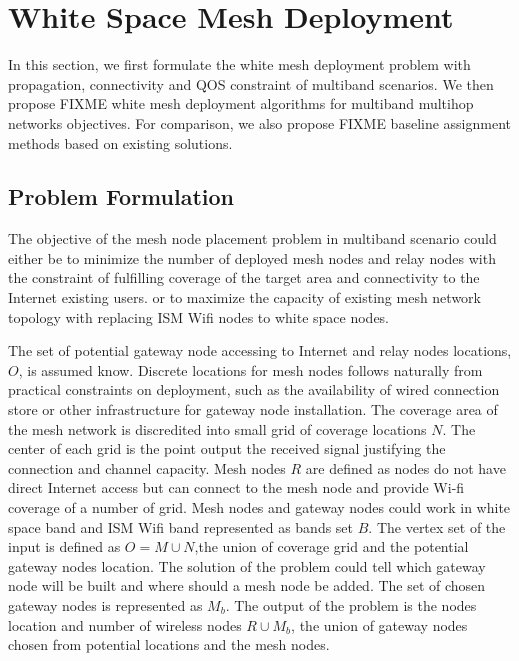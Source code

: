 \section{White Space Mesh Deployment}
\label{sec:model}

In this section, we first formulate the 
white mesh deployment problem
with propagation, connectivity and QOS constraint of multiband scenarios.
We then propose {FIXME} white mesh deployment algorithms for multiband multihop networks objectives.
For comparison, we also propose {FIXME} baseline assignment methods based on existing solutions.

\subsection{Problem Formulation}
The objective of the mesh node placement problem in multiband scenario could either be 
to minimize the number of deployed mesh nodes and relay nodes with the constraint of fulfilling coverage of the target area and connectivity to the Internet existing users. 
or to maximize the capacity of existing mesh network topology with replacing ISM Wifi nodes to white space nodes.

The set of potential gateway node accessing to Internet and relay nodes locations, $O$, is assumed know. 
Discrete locations for mesh nodes follows naturally from practical constraints on deployment, such as the availability of wired connection store or other infrastructure for gateway node installation.
The coverage area of the mesh network is discredited into small grid of coverage locations $N$. The center of each grid is the point output the received signal justifying the connection and channel capacity.
Mesh nodes $R$  are defined as nodes do not have direct Internet access but can connect to the mesh node and provide Wi-fi coverage of a number of grid.
Mesh nodes and gateway nodes could work in white space band and ISM Wifi band represented as bands set $B$.
The vertex set of the input is defined as $O=M\cup N$,the union of  coverage grid and the potential gateway nodes location. 
The solution of the problem could tell which gateway node will be built and where should a mesh node be added. The set of chosen gateway nodes is represented as $M_b$. 
The output of the problem is the nodes location and number of wireless nodes $R\cup M_b$, the union of gateway nodes chosen from potential locations and the mesh nodes. 


